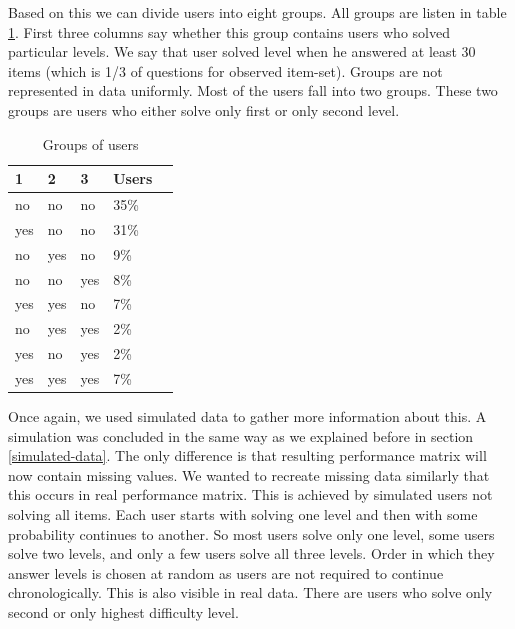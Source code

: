 \documentclass[
  digital, %
  table,   %
  nolof,     %
  nolot,     %
  nocover,
  color,
  final, %
]{fithesis3}
\begin{document}
Based on this we can divide users into eight groups. All groups are listen in table \ref{tab:user-groups}. First three columns say whether this group contains users who solved particular levels. We say that user solved level when he answered at least 30 items (which is 1/3 of questions for observed item-set). Groups are not represented in data uniformly. Most of the users fall into two groups. These two groups are users who either solve only first or only second level.

\begin{table}
  \begin{tabular}{ | l | l | l | l | l | }
    \hline
      1   & 2   & 3   & Users \\ \hline
      no  & no  & no  & 35\%  \\ \hline
      yes & no  & no  & 31\%  \\ \hline
      no  & yes & no  & 9\%   \\ \hline
      no  & no  & yes & 8\%   \\ \hline
      yes & yes & no  & 7\%   \\ \hline
      no  & yes & yes & 2\%   \\ \hline
      yes & no  & yes & 2\%   \\ \hline
      yes & yes & yes & 7\%   \\ \hline
  \end{tabular}
  \caption{Groups of users}
  \label{tab:user-groups}
\end{table}


Once again, we used simulated data to gather more information about this. A simulation was concluded in the same way as we explained before in section \ref{simulated-data}. The only difference is that resulting performance matrix will now contain missing values. We wanted to recreate missing data similarly that this occurs in real performance matrix. This is achieved by simulated users not solving all items. Each user starts with solving one level and then with some probability continues to another. So most users solve only one level, some users solve two levels, and only a few users solve all three levels. Order in which they answer levels is chosen at random as users are not required to continue chronologically. This is also visible in real data. There are users who solve only second or only highest difficulty level.

\end{document}
